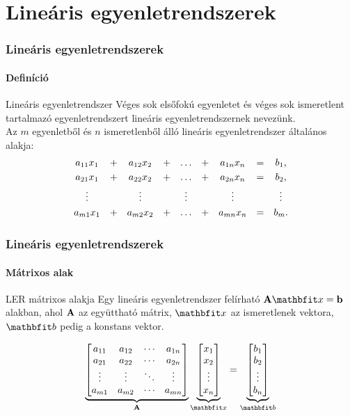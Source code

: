 \section{Lineáris egyenletrendszerek}
\begin{frame}
  \frametitle{Lineáris egyenletrendszerek}
  \framesubtitle{Definíció}

  \begin{block}{Lineáris egyenletrendszer}
    Véges sok elsőfokú egyenletet és véges sok ismeretlent tartalmazó
    egyenletrendszert lineáris egyenletrendszernek nevezünk.
    \\[2mm]
    Az $m$ egyenletből és $n$ ismeretlenből álló lineáris egyenletrendszer
    általános alakja:
    \[
      \begin{array}{*{9}{c}}
        a_{11} x_{1} & + & a_{12} x_{2} & + & \dots  & + & a_{1n} x_{n} & = & b_{1}\text, \\[1mm]
        a_{21} x_{1} & + & a_{22} x_{2} & + & \dots  & + & a_{2n} x_{n} & = & b_{2}\text, \\[1mm]
        \vdots       &   & \vdots       &   & \vdots &   & \vdots       &   & \vdots      \\[1mm]
        a_{m1} x_{1} & + & a_{m2} x_{2} & + & \dots  & + & a_{mn} x_{n} & = & b_{m}\text.
      \end{array}
    \]
  \end{block}
\end{frame}

\begin{frame}
  \frametitle{Lineáris egyenletrendszerek}
  \framesubtitle{Mátrixos alak}

  \begin{block}{LER mátrixos alakja}
    Egy lineáris egyenletrendszer felírható $\rmat A \rvec x = \rmat b$
    alakban, ahol $\mathbf{A}$ az együttható mátrix, $\rvec x$ az ismeretlenek
    vektora, $\rvec b$ pedig a konstans vektor.

    \[
      \underbrace{\begin{bmatrix}
          a_{11} & a_{12} & \cdots & a_{1n} \\
          a_{21} & a_{22} & \cdots & a_{2n} \\
          \vdots & \vdots & \ddots & \vdots \\
          a_{m1} & a_{m2} & \cdots & a_{mn}
        \end{bmatrix}}_{\rmat A} \underbrace{\begin{bmatrix}
          x_{1} \\ x_{2} \\ \vdots \\ x_{n}
        \end{bmatrix}}_{\rvec x} = \underbrace{\begin{bmatrix}
          b_{1} \\ b_{2} \\ \vdots \\ b_{n}
        \end{bmatrix}}_{\rvec b}
    \]
  \end{block}
\end{frame}

